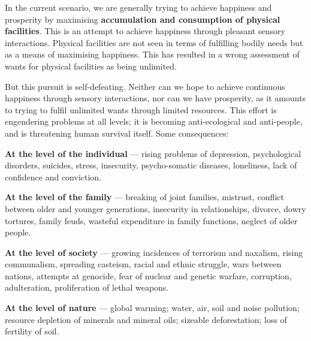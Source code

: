 
\ans In the current scenario, we are generally trying to achieve happiness and
prosperity by maximising \textbf{accumulation and consumption of physical
facilities}. This is an attempt to achieve happiness through pleasant sensory
interactions. Physical facilities are not seen in terms of fulfilling bodily
needs but as a means of maximising happiness. This has resulted in a wrong
assessment of wants for physical facilities as being unlimited.

But this pursuit is self-defeating. Neither can we hope to achieve continuous
happiness through sensory interactions, nor can we have prosperity, as it
amounts to trying to fulfil unlimited wants through limited resources. This
effort is engendering problems at all levels; it is becoming anti-ecological
and anti-people, and is threatening human survival itself. Some consequences:

\begin{abul}
\item \textbf{At the level of the individual} --- rising problems of
      depression, psychological disorders, suicides, stress, insecurity,
      psycho-somatic diseases, loneliness, lack of confidence and conviction.
\item \textbf{At the level of the family} --- breaking of joint families,
      mistrust, conflict between older and younger generations, insecurity in
      relationships, divorce, dowry tortures, family feuds, wasteful
      expenditure in family functions, neglect of older people.
\item \textbf{At the level of society} --- growing incidences of terrorism and
      naxalism, rising communalism, spreading casteism, racial and ethnic
      struggle, wars between nations, attempts at genocide, fear of nuclear
      and genetic warfare, corruption, adulteration, proliferation of lethal
      weapons.
\item \textbf{At the level of nature} --- global warming; water, air, soil and
      noise pollution; resource depletion of minerals and mineral oils;
      sizeable deforestation; loss of fertility of soil.
\end{abul}

